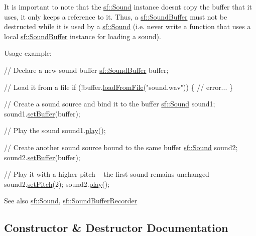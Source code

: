 It is important to note that the \hyperlink{classsf_1_1_sound}{sf\+::\+Sound} instance doesn\textquotesingle{}t copy the buffer that it uses, it only keeps a reference to it. Thus, a \hyperlink{classsf_1_1_sound_buffer}{sf\+::\+Sound\+Buffer} must not be destructed while it is used by a \hyperlink{classsf_1_1_sound}{sf\+::\+Sound} (i.\+e. never write a function that uses a local \hyperlink{classsf_1_1_sound_buffer}{sf\+::\+Sound\+Buffer} instance for loading a sound).

Usage example\+: 
\begin{DoxyCode}
\textcolor{comment}{// Declare a new sound buffer}
\hyperlink{classsf_1_1_sound_buffer}{sf::SoundBuffer} buffer;

\textcolor{comment}{// Load it from a file}
\textcolor{keywordflow}{if} (!buffer.\hyperlink{classsf_1_1_sound_buffer_a2be6a8025c97eb622a7dff6cf2594394}{loadFromFile}(\textcolor{stringliteral}{"sound.wav"}))
\{
    \textcolor{comment}{// error...}
\}

\textcolor{comment}{// Create a sound source and bind it to the buffer}
\hyperlink{classsf_1_1_sound}{sf::Sound} sound1;
sound1.\hyperlink{classsf_1_1_sound_a8b395e9713d0efa48a18628c8ec1972e}{setBuffer}(buffer);

\textcolor{comment}{// Play the sound}
sound1.\hyperlink{classsf_1_1_sound_a2953ffe632536e72e696fd880ced2532}{play}();

\textcolor{comment}{// Create another sound source bound to the same buffer}
\hyperlink{classsf_1_1_sound}{sf::Sound} sound2;
sound2.\hyperlink{classsf_1_1_sound_a8b395e9713d0efa48a18628c8ec1972e}{setBuffer}(buffer);

\textcolor{comment}{// Play it with a higher pitch -- the first sound remains unchanged}
sound2.\hyperlink{classsf_1_1_sound_source_a72a13695ed48b7f7b55e7cd4431f4bb6}{setPitch}(2);
sound2.\hyperlink{classsf_1_1_sound_a2953ffe632536e72e696fd880ced2532}{play}();
\end{DoxyCode}


\begin{DoxySeeAlso}{See also}
\hyperlink{classsf_1_1_sound}{sf\+::\+Sound}, \hyperlink{classsf_1_1_sound_buffer_recorder}{sf\+::\+Sound\+Buffer\+Recorder} 
\end{DoxySeeAlso}


\subsection{Constructor \& Destructor Documentation}
\mbox{\label{classsf_1_1_sound_buffer_aaf000fc741ff27015907e8588263f4a6}} 
